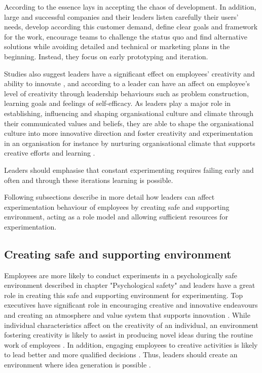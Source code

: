 According to \citet{quinn1985managing} the essence lays in accepting the chaos of development. In addition, large and successful companies and their leaders listen carefully their users' needs, develop according this customer demand, define clear goals and framework for the work, encourage teams to challenge the status quo and find alternative solutions while avoiding detailed and technical or marketing plans in the beginning. Instead, they focus on early prototyping and iteration. \citep{quinn1985managing}

 Studies also suggest leaders have a significant effect on employees' creativity and ability to innovate \citep{mumford2002leading,jung2001transformational,amabile1998kill,hennessey19881}, and according to \citet{redmond1993putting} a leader can have an affect on employee's level of creativity through leadership behaviours such as problem construction, learning goals and feelings of self-efficacy. As leaders play a major role in establishing, influencing and shaping organisational culture and climate through their communicated values and beliefs, they are able to shape the organisational culture into more innovative direction and foster creativity and experimentation in an organisation \citep{jung2003role,schein2010organizational} for instance by nurturing organisational climate that supports creative efforts and learning \citep{yukl2002leadership}. 
 
 Leaders should emphasise that constant experimenting requires failing early and often and through these iterations learning is possible. \citep{amabile2008creativity, amabile1996assessing} 

Following subsections describe in more detail how leaders can affect experimentation behaviour of employees by creating safe and supporting environment, acting as a role model and allowing sufficient resources for experimentation. 

\subsection{Creating safe and supporting environment}
Employees are more likely to conduct experiments in a psychologically safe environment described in chapter "Psychological safety" and leaders have a great role in creating this safe and supporting environment for experimenting. Top executives have significant role in encouraging creative and innovative endeavours and creating an atmosphere and value system that supports innovation \citep{quinn1985managing}. While individual characteristics affect on the creativity of an individual, an environment fostering creativity is likely to assist in producing novel ideas during the routine work of employees \citep{amabile1996assessing}. In addition, engaging employees to creative activities is likely to lead better and more qualified decisions \citep{shalley2004leaders}. Thus, leaders should create an environment where idea generation is possible \citep{andrews1970social}.


